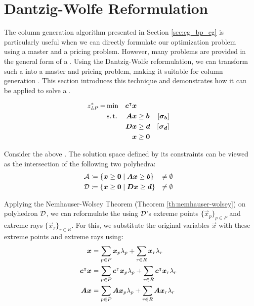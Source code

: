 \section{Dantzig-Wolfe Reformulation}\label{sec:cg_bp_dwr}

The column generation algorithm presented in Section \ref{sec:cg_bp_cg} is particularly useful when we can directly formulate our optimization problem using a master and a pricing problem. However, many problems are provided in the general form of a \LP{}. Using the Dantzig-Wolfe reformulation, we can transform such a \LP{} into a master and pricing problem, making it suitable for column generation \cite{thebook}. This section introduces this technique and demonstrates how it can be applied to solve a \LP{}.

\begin{equation}
\begin{aligned}
z^*_{\textit{LP}}{} = &\min & {\bm{c}}^\intercal {\bm{x}} & & & \\
&\operatorname{s.t.} & {\bm{A}} {\bm{x}} & \geq {\bm{b}} & \left[{\bm{\sigma}}_{\bm{b}}\right] & \\
&& {\bm{D}} {\bm{x}} & \geq {\bm{d}} & \left[{\bm{\sigma}}_{\bm{d}}\right] & \\
&& {\bm{x}} & \geq {\bm{0}}
\end{aligned}
\end{equation}

Consider the above \LP{}. The solution space defined by its constraints can be viewed as the intersection of the following two polyhedra:
\begin{equation}
\begin{aligned}
\mathcal{A} &\coloneqq \left\{ {\bm{x}} \geq {\bm{0}} \mid {\bm{A}} {\bm{x}} \geq {\bm{b}} \right\} &\neq \emptyset \\
\mathcal{D} &\coloneqq \left\{ {\bm{x}} \geq {\bm{0}} \mid {\bm{D}} {\bm{x}} \geq {\bm{d}} \right\} &\neq \emptyset
\end{aligned}
\end{equation}

Applying the Nemhauser-Wolsey Theorem (Theorem \ref{th:nemhauser-wolsey}) on polyhedron $\mathcal{D}$, we can reformulate the \LP{} using $\mathcal{D}$'s extreme points $\{\vec{x}_p\}_{p \in P}$ and extreme rays $\{\vec{x}_r\}_{r \in R}$. For this, we substitute the original variables $\vec{x}$ with these extreme points and extreme rays using:
\begin{equation}
\begin{aligned}
{\bm{x}} &= \sum_{p \in P} {\bm{x}}_p \lambda_p + \sum_{r \in R} {\bm{x}}_r \lambda_r \\
{\bm{c}}^\intercal {\bm{x}} &= \sum_{p \in P} {\bm{c}}^\intercal {\bm{x}}_p \lambda_p + \sum_{r \in R} {\bm{c}}^\intercal {\bm{x}}_r \lambda_r \\
{\bm{A}} {\bm{x}} &= \sum_{p \in P} {\bm{A}} {\bm{x}}_p \lambda_p + \sum_{r \in R} {\bm{A}} {\bm{x}}_r \lambda_r
\end{aligned}
\end{equation}

